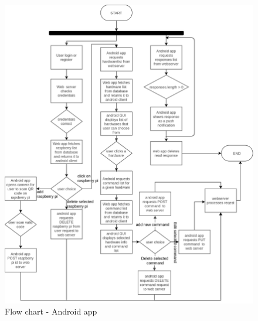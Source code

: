\documentclass[12pt]{paper}
\begin{document}
		\begin{figure}[H]
			\includegraphics[width=\linewidth]{img/flowchart_android.png}
			\caption{Flow chart - Android app}
			\label{fig:ig:flow_android}
		\end{figure}
\end{document}
